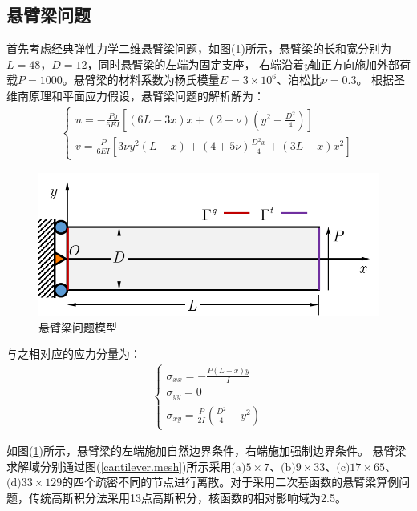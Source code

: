 \subsection{悬臂梁问题}
首先考虑经典弹性力学二维悬臂梁问题，如图(\ref{cantilever})所示，悬臂梁的长和宽分别为$L=48$，$D=12$，同时悬臂梁的左端为固定支座，
右端沿着$y$轴正方向施加外部荷载$P=1000$。悬臂梁的材料系数为杨氏模量$E=3\times10^6$、泊松比$\nu=0.3$。
根据圣维南原理和平面应力假设，悬臂梁问题的解析解为：
\begin{equation}
\begin{split}
\begin{cases}
    u = -\frac{Py}{6EI}[(6L-3x)x + (2+\nu)(y^2 - \frac{D^2}{4})] \\
    v = \frac{P}{6EI}[3\nu y^2(L-x) + (4+5\nu)\frac{D^2x}{4} + (3L-x)x^2]
\end{cases}
\end{split}
\end{equation}\par
\begin{figure}[!h]
    \centering
    \includegraphics{figure/cantilever.png}
    \caption{悬臂梁问题模型}\label{cantilever}
\end{figure}
与之相对应的应力分量为：
\begin{equation}
\begin{split}
\begin{cases}
   \sigma_{xx}=-\frac{P(L-x)y}{I}\\
   \sigma_{yy}=0\\
   \sigma_{xy}=\frac{P}{2I}(\frac{D^2}{4}-y^2)
\end{cases}
\end{split}
\end{equation}\par
如图(\ref{cantilever})所示，悬臂梁的左端施加自然边界条件，右端施加强制边界条件。
悬臂梁求解域分别通过图(\ref{cantilever.mesh})所示采用$\text{(a)}5\times7$、$\text{(b)}9\times33$、$\text{(c)}17\times65$、$\text{(d)}33\times129$的四个疏密不同的节点进行离散。对于采用二次基函数的悬臂梁算例问题，传统高斯积分法采用13点高斯积分，核函数的相对影响域为2.5。\par
